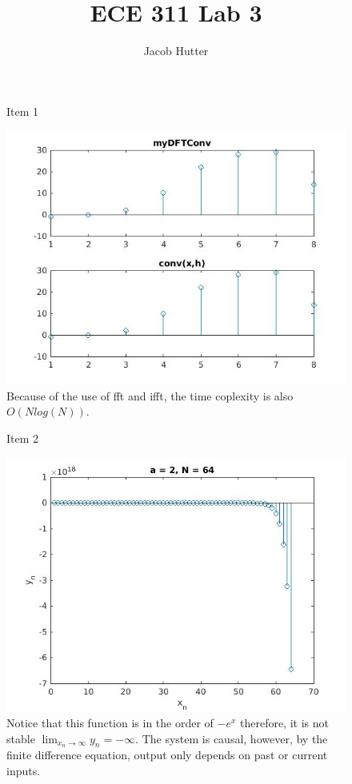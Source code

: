 \documentclass{article}
\author{Jacob Hutter}
\title{ECE 311 Lab 3}
\begin{document}
\maketitle

\begin{figure}[H]
\Report Item 1

\includegraphics[scale = .5]{report1}
\\ Because of the use of fft and ifft, the time coplexity is also $O(Nlog(N))$.
\end{figure}



\begin{figure}[H]
\Report Item 2

\includegraphics[scale = .5]{report2}
\\ Notice that this function is in the order of $-e^x$ 
therefore, it is not stable $\lim_{x_n\to\infty} y_n = -\infty$.
The system is causal, however, by the finite difference equation, output only 
depends on past or current inputs.
\end{figure}
\end{document}

